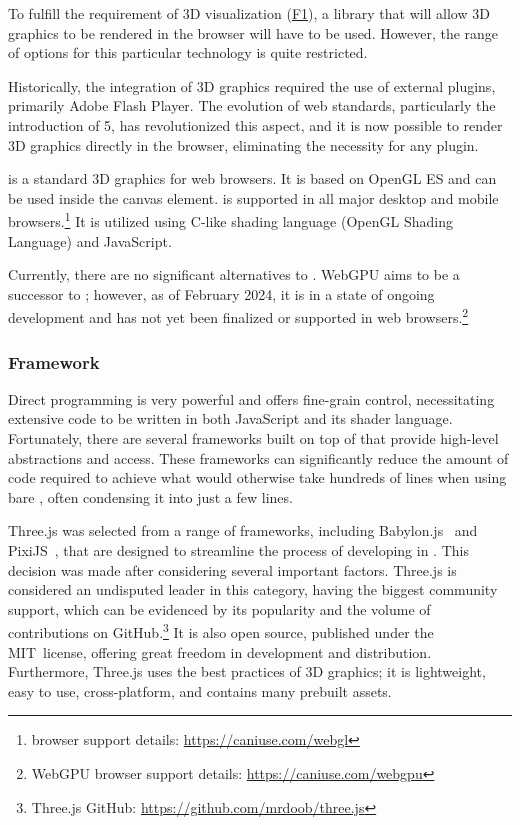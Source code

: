 To fulfill the requirement of 3D visualization (\hyperref[itm:F1]{F1}), a library that will allow 3D graphics to be rendered in the browser will have to be used. However, the range of options for this particular technology is quite restricted.

Historically, the integration of 3D graphics required the use of external plugins, primarily Adobe Flash Player. The evolution of web standards, particularly the introduction of 5, has revolutionized this aspect, and it is now possible to render 3D graphics directly in the browser, eliminating the necessity for any plugin.~\cite{Parisi2014}

 is a standard 3D graphics  for web browsers. It is based on OpenGL ES and can be used inside the  canvas element.  is supported in all major desktop and mobile browsers.\footnote{ browser support details: \url{https://caniuse.com/webgl}} It is utilized using C-like shading language (OpenGL Shading Language) and JavaScript.~\cite{Parisi2012}

Currently, there are no significant alternatives to . WebGPU aims to be a successor to ; however, as of February 2024, it is in a state of ongoing development and has not yet been finalized or supported in web browsers.\footnote{WebGPU browser support details: \url{https://caniuse.com/webgpu}}~\cite{WebGPU}


\subsubsection{ Framework} \label{section:WebGL}

Direct  programming is very powerful and offers fine-grain control, necessitating extensive code to be written in both JavaScript and its shader language. Fortunately, there are several frameworks built on top of  that provide high-level abstractions and access. These frameworks can significantly reduce the amount of code required to achieve what would otherwise take hundreds of lines when using bare , often condensing it into just a few lines.~\cite{Parisi2014}

Three.js was selected from a range of frameworks, including Babylon.js~\cite{BabylonJs} and PixiJS~\cite{PixiJS}, that are designed to streamline the process of developing in . This decision was made after considering several important factors.
Three.js is considered an undisputed leader in this category, having the biggest community support, which can be evidenced by its popularity and the volume of contributions on GitHub.\footnote{Three.js GitHub: \url{https://github.com/mrdoob/three.js}} It is also open source, published under the MIT~license, offering great freedom in development and distribution. Furthermore, Three.js uses the best practices of 3D graphics; it is lightweight, easy to use, cross-platform, and contains many prebuilt assets.~\cite{ThreeJs}


